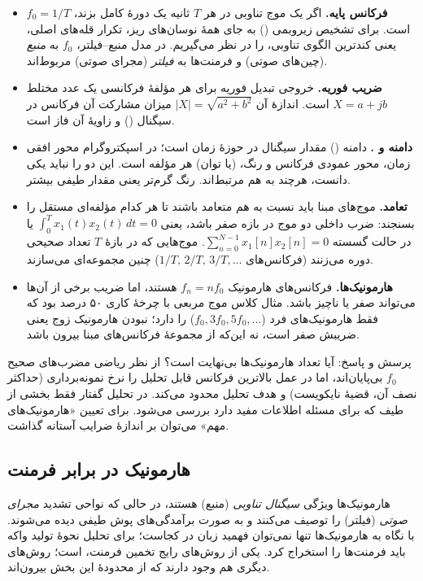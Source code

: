 \begin{itemize}
  \item \textbf{فرکانس پایه.} اگر یک موج تناوبی در هر $T$ ثانیه یک دورهٔ کامل بزند، $f_0=1/T$ است. برای تشخیص زیروبمی () به جای همهٔ نوسان‌های ریز، تکرار قله‌های اصلی، یعنی کندترین الگوی تناوبی، را در نظر می‌گیریم. در مدل منبع–فیلتر، $f_0$ به \emph{منبع} (چین‌های صوتی) و فرمنت‌ها به \emph{فیلتر} (مجرای صوتی) مربوط‌اند.
  \item \textbf{ضریب فوریه.} خروجی تبدیل فوریه برای هر مؤلفهٔ فرکانسی یک عدد مختلط $X=a+jb$ است. اندازهٔ آن $|X|=\sqrt{a^2+b^2}$ میزان مشارکت آن فرکانس در سیگنال () و زاویهٔ آن فاز است.
  \item \textbf{دامنه و .} دامنه () مقدار سیگنال در حوزهٔ زمان است؛ در اسپکتروگرام محور افقی زمان، محور عمودی فرکانس و رنگ،  (یا توان) هر مؤلفه است. این دو را نباید یکی دانست، هرچند به هم مرتبط‌اند. رنگ گرم‌تر یعنی مقدار طیفی بیشتر.
  \item \textbf{تعامد.} موج‌های مبنا باید نسبت به هم متعامد باشند تا هر کدام مؤلفه‌ای مستقل را بسنجند: ضرب داخلی دو موج در بازه صفر باشد، یعنی $\int_0^T x_1(t)x_2(t)\,dt=0$ یا در حالت گسسته $\sum_{n=0}^{N-1}x_1[n]x_2[n]=0$. موج‌هایی که در بازهٔ $T$ تعداد صحیحی دوره می‌زنند (فرکانس‌های $1/T,\,2/T,\,3/T,\dots$) چنین مجموعه‌ای می‌سازند.
  \item \textbf{هارمونیک‌ها.} فرکانس‌های هارمونیک $f_n=nf_0$ هستند، اما ضریب برخی از آن‌ها می‌تواند صفر یا ناچیز باشد. مثال کلاس موج مربعی با چرخهٔ کاری ۵۰ درصد بود که فقط هارمونیک‌های فرد ($f_0,3f_0,5f_0,\dots$) را دارد؛ نبودن هارمونیک زوج یعنی ضریبش صفر است، نه این‌که از مجموعهٔ فرکانس‌های مبنا بیرون باشد.
\end{itemize}

\begin{exambox}{پرسش و پاسخ: آیا تعداد هارمونیک‌ها بی‌نهایت است؟}
از نظر ریاضی مضرب‌های صحیح $f_0$ بی‌پایان‌اند، اما در عمل بالاترین فرکانس قابل تحلیل را نرخ نمونه‌برداری (حداکثر نصف آن، قضیهٔ نایکویست) و هدف تحلیل محدود می‌کند. در تحلیل گفتار فقط بخشی از طیف که برای مسئله اطلاعات مفید دارد بررسی می‌شود. برای تعیین «هارمونیک‌های مهم» می‌توان بر اندازهٔ ضرایب آستانه گذاشت.
\end{exambox}

\subsection{هارمونیک در برابر فرمنت}
هارمونیک‌ها ویژگی \emph{سیگنال تناوبی} (منبع) هستند، در حالی که  نواحی تشدید \emph{مجرای صوتی} (فیلتر) را توصیف می‌کنند و به صورت برآمدگی‌های پوش طیفی دیده می‌شوند. با نگاه به هارمونیک‌ها تنها نمی‌توان فهمید زبان در کجاست؛ برای تحلیل نحوهٔ تولید واکه باید فرمنت‌ها را استخراج کرد. یکی از روش‌های رایج تخمین فرمنت،  است؛ روش‌های دیگری هم وجود دارند که از محدودهٔ این بخش بیرون‌اند.

